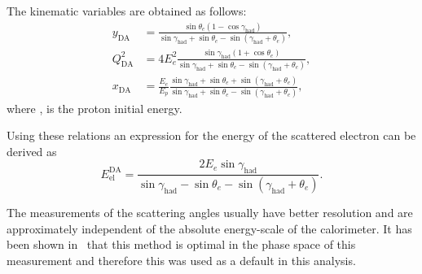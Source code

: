 The kinematic variables are obtained as follows:
\begin{align}
	y_\text{DA}      &= \frac{ \sin \theta_e \left( 1 - \cos \gamma_\text{had} \right)}{ \sin \gamma_\text{had} + \sin \theta_e - \sin \left( \gamma_\text{had} + \theta_e \right) },			\label{eq:yda} \\
	Q^2_\text{DA} &= 4E_e^2\frac{ \sin \gamma_\text{had} \left( 1 + \cos \theta_e \right) }{ \sin \gamma_\text{had} + \sin \theta_e - \sin \left( \gamma_\text{had} + \theta_e \right) },			\label{eq:q2da}							\\
	x_\text{DA}      &= \frac{E_e}{E_p} \frac{\sin \gamma_\text{had} + \sin \theta_e + \sin \left( \gamma_\text{had} + \theta_e \right)}{\sin \gamma_\text{had} + \sin \theta_e - \sin \left( \gamma_\text{had} + \theta_e \right)},			\label{eq:xda}
\end{align}
where \epini, is the proton initial energy.

Using these relations an expression for the energy of the scattered electron can be derived as
\begin{equation}
E_\text{el}^\text{DA} = \frac{2E_e \sin \gamma_\text{had}}{\sin \gamma_\text{had} - \sin \theta_e - \sin \left( \gamma_\text{had} + \theta_e \right)}.
\label{eq:eeda}
\end{equation}

 The measurements of the scattering angles usually have better resolution and are approximately independent of the absolute energy-scale of the calorimeter. It has been shown in~\cite{thesis:behr:2010} that this method is optimal in the phase space of this measurement and therefore this was used as a default in this analysis.

